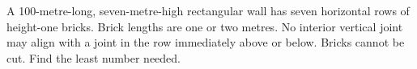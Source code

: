 A 100-metre-long, seven-metre-high rectangular wall has seven horizontal rows of height-one bricks. Brick lengths are one or two metres. No interior vertical joint may align with a joint in the row immediately above or below. Bricks cannot be cut. Find the least number needed.
